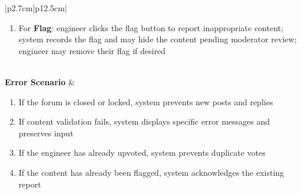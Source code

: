 \begin{table}[H]
\begin{tabular}{|p{2.7cm}|p{12.5cm}|}
\begin{minipage}[t]{\linewidth}
\begin{enumerate}[topsep=0pt,itemsep=1pt,parsep=0pt,partopsep=0pt]
                                                    their upvote at any time
                                              \item For \textbf{Flag}: engineer clicks the flag button to report inappropriate
                                                    content; system records the flag and may hide the content pending moderator
                                                    review; engineer may remove their flag if desired
                                          \end{enumerate}
                                      \end{minipage}                                                                        \\
            \hline
            \textbf{Error Scenario} & \begin{minipage}[t]{\linewidth}
                                          \begin{enumerate}[topsep=0pt,itemsep=1pt,parsep=0pt,partopsep=0pt]
                                              \item If the forum is closed or locked, system prevents new posts and replies
                                              \item If content validation fails, system displays specific error messages and
                                                    preserves input
                                              \item If the engineer has already upvoted, system prevents duplicate votes
                                              \item If the content has already been flagged, system acknowledges the existing
                                                    report
                                          \end{enumerate}
                                      \end{minipage}                                                                           \\
            \hline
        \end{tabular}
        \label{tab:eng-forum-participate}
    \end{table}

